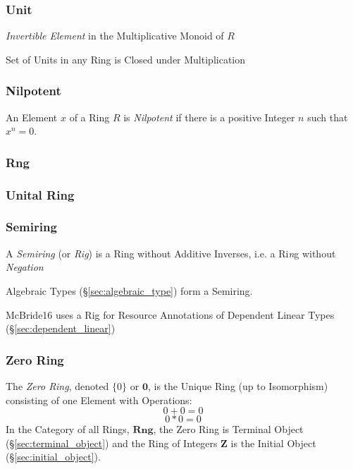 \subsubsection{Unit}\label{sec:ring_unit}

\emph{Invertible Element} in the Multiplicative Monoid of $R$

Set of Units in any Ring is Closed under Multiplication



\subsubsection{Nilpotent}\label{sec:nilpotent}

An Element $x$ of a Ring $R$ is \emph{Nilpotent} if there is a
positive Integer $n$ such that $x^n = 0$.



\subsubsection{Rng}\label{sec:rng}

\subsubsection{Unital Ring}\label{sec:unital_ring}

\subsubsection{Semiring}\label{sec:semiring}

A \emph{Semiring} (or \emph{Rig}) is a Ring without Additive Inverses,
i.e. a Ri\emph{n}g without \emph{Negation}

Algebraic Types (\S\ref{sec:algebraic_type}) form a Semiring.

McBride16 uses a Rig for Resource Annotations of Dependent Linear
Types (\S\ref{sec:dependent_linear})



\subsubsection{Zero Ring}\label{sec:zero_ring}

The \emph{Zero Ring}, denoted $\{0\}$ or $\mathbf{0}$, is the Unique Ring
(up to Isomorphism) consisting of one Element with Operations:
\[
    0 + 0 = 0
\] \[
    0 * 0 = 0
\]
In the Category of all Rings, $\mathbf{Rng}$, the Zero Ring is
Terminal Object (\S\ref{sec:terminal_object}) and the Ring of Integers
$\mathbf{Z}$ is the Initial Object (\S\ref{sec:initial_object}).



